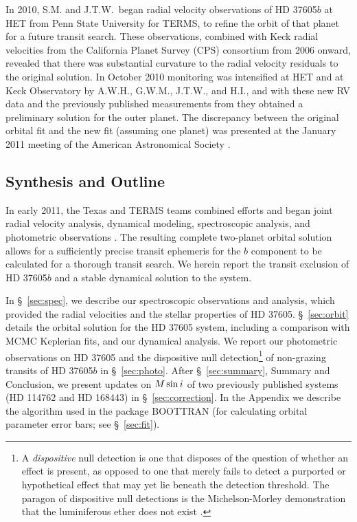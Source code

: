 In 2010, S.M. and J.T.W.\ began radial velocity observations of HD
37605$b$ at HET from Penn State University for TERMS, to refine the
orbit of that planet for a future transit search. These observations,
combined with Keck radial velocities from the California Planet Survey (CPS)
consortium from 2006 onward, revealed that there was substantial
curvature to the radial velocity residuals to the original
\cite{cochran2004} solution. In October 2010 monitoring was
intensified at HET and at Keck Observatory by A.W.H., G.W.M., J.T.W.,
and H.I., and with these new RV data and the previously published
measurements from \cite{wit2007} they obtained a preliminary
solution for the outer planet. The discrepancy between the original
orbital fit and the new fit (assuming one planet) was presented at the
January 2011 meeting of the American Astronomical Society
\citep{terms2011aas}.

\subsection{Synthesis and Outline}

In early 2011, the Texas and TERMS teams combined efforts and began
joint radial velocity analysis, dynamical modeling, spectroscopic
analysis, and photometric observations \citep{terms2012aas}. The
resulting complete two-planet orbital solution allows for a
sufficiently precise transit ephemeris for the $b$ component to be
calculated for a thorough transit search. We herein report the transit
exclusion of HD 37605$b$ and a stable dynamical solution to the
system.

In \S~\ref{sec:spec}, we describe our spectroscopic observations and
analysis, which provided the radial velocities and the stellar
properties of HD 37605. \S~\ref{sec:orbit} details the orbital
solution for the HD 37605 system, including a comparison with MCMC
Keplerian fits, and our dynamical analysis. We report our photometric
observations on HD 37605 and the dispositive null detection\footnote{A
  {\em dispositive} null detection is one that disposes of the
  question of whether an effect is present, as opposed to one that
  merely fails to detect a purported or hypothetical effect that may
  yet lie beneath the detection threshold.  The paragon of dispositive
  null detections is the Michelson-Morley demonstration that the
  luminiferous ether does not exist \citep{michelson1887}.} of
non-grazing transits of HD 37605$b$ in \S~\ref{sec:photo}. After
\S~\ref{sec:summary}, Summary and Conclusion, we present updates on
$M\sin{i}$ of two previously published systems (HD 114762 and HD 168443)
in \S~\ref{sec:correction}. In the Appendix we describe the algorithm
used in the package BOOTTRAN (for calculating orbital parameter error
bars; see \S~\ref{sec:fit}).



